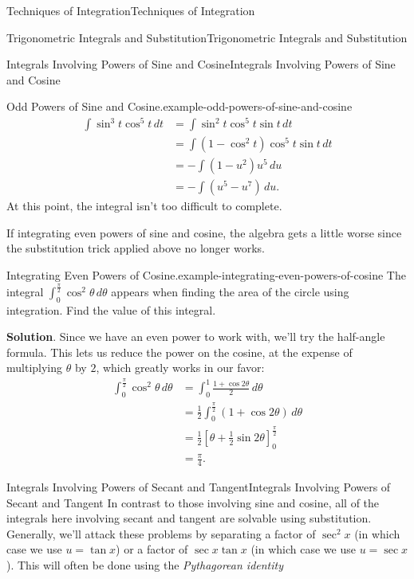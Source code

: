 \documentclass[10pt,]{book}
\numberwithin{equation}{section}
\begin{document}
\begin{chapterptx}{Techniques of Integration}{}{Techniques of Integration}{}{}
\begin{sectionptx}{Trigonometric Integrals and Substitution}{}{Trigonometric Integrals and Substitution}{}{}
\begin{subsectionptx}{Integrals Involving Powers of Sine and Cosine}{}{Integrals Involving Powers of Sine and Cosine}{}{}
\begin{example}{Odd Powers of Sine and Cosine.}{example-odd-powers-of-sine-and-cosine}
\begin{align*}
\int\sin^{3}t\cos^{5}t\,dt & = \int\sin^{2}t\cos^{5}t\sin t\,dt \\
& = \int(1 - \cos^{2}t)\cos^{5}t\sin t\,dt \\
& = -\int(1 - u^{2})u^{5}\,du \\
& = -\int (u^{5} - u^{7})\,du. 
\end{align*}
\hypertarget{p-527}{}%
At this point, the integral isn't too difficult to complete.%
\end{example}
\hypertarget{p-528}{}%
If integrating even powers of sine and cosine, the algebra gets a little worse since the substitution trick applied above no longer works.%
\begin{example}{Integrating Even Powers of Cosine.}{example-integrating-even-powers-of-cosine}%
\hypertarget{p-529}{}%
The integral \(\int_{0}^{\frac{\pi}{2}}\cos^{2}\theta\,d\theta\) appears when finding the area of the circle using integration. Find the value of this integral.%
\par\smallskip%
\noindent\textbf{Solution}.\hypertarget{solution-116}{}\quad%
\hypertarget{p-530}{}%
Since we have an even power to work with, we'll try the half-angle formula. This lets us reduce the power on the cosine, at the expense of multiplying \(\theta\) by \(2\), which greatly works in our favor:%
%
\begin{align*}
\int_{0}^{\frac{\pi}{2}}\cos^{2}\theta\,d\theta & =\int_{0}^{1}\frac{1 + \cos2\theta}{2}\,d\theta \\
& = \frac{1}{2}\int_{0}^{\frac{\pi}{2}}(1 + \cos2\theta)\,d\theta \\
& = \frac{1}{2}\left[\theta + \frac{1}{2}\sin2\theta\right]_{0}^{\frac{\pi}{2}} \\
& = \frac{\pi}{4}. 
\end{align*}
\end{example}
\end{subsectionptx}
%
%
\typeout{************************************************}
\typeout{************************************************}
%
\begin{subsectionptx}{Integrals Involving Powers of Secant and Tangent}{}{Integrals Involving Powers of Secant and Tangent}{}{}\label{subsection-integrals-involving-powers-of-secant-and-tangent}
\hypertarget{p-531}{}%
In contrast to those involving sine and cosine, all of the integrals here involving secant and tangent are solvable using substitution. Generally, we'll attack these problems by separating a factor of \(\sec^{2}x\) (in which case we use \(u = \tan x\)) or a factor of \(\sec x\tan x\) (in which case we use \(u = \sec x\)). This will often be done using the \emph{Pythagorean identity}%

\end{subsectionptx}
\end{sectionptx}
\end{chapterptx}
\end{document}
